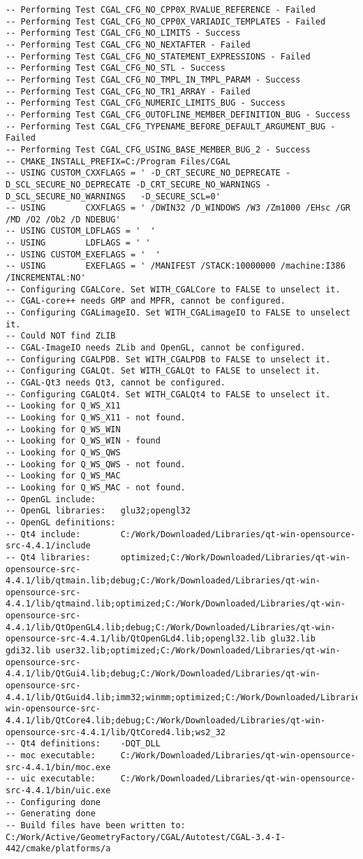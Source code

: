 {\begin{verbatim}
-- Performing Test CGAL_CFG_NO_CPP0X_RVALUE_REFERENCE - Failed
-- Performing Test CGAL_CFG_NO_CPP0X_VARIADIC_TEMPLATES - Failed
-- Performing Test CGAL_CFG_NO_LIMITS - Success
-- Performing Test CGAL_CFG_NO_NEXTAFTER - Failed
-- Performing Test CGAL_CFG_NO_STATEMENT_EXPRESSIONS - Failed
-- Performing Test CGAL_CFG_NO_STL - Success
-- Performing Test CGAL_CFG_NO_TMPL_IN_TMPL_PARAM - Success
-- Performing Test CGAL_CFG_NO_TR1_ARRAY - Failed
-- Performing Test CGAL_CFG_NUMERIC_LIMITS_BUG - Success
-- Performing Test CGAL_CFG_OUTOFLINE_MEMBER_DEFINITION_BUG - Success
-- Performing Test CGAL_CFG_TYPENAME_BEFORE_DEFAULT_ARGUMENT_BUG - Failed
-- Performing Test CGAL_CFG_USING_BASE_MEMBER_BUG_2 - Success
-- CMAKE_INSTALL_PREFIX=C:/Program Files/CGAL
-- USING CUSTOM_CXXFLAGS = ' -D_CRT_SECURE_NO_DEPRECATE -D_SCL_SECURE_NO_DEPRECATE -D_CRT_SECURE_NO_WARNINGS -D_SCL_SECURE_NO_WARNINGS   -D_SECURE_SCL=0'
-- USING        CXXFLAGS = ' /DWIN32 /D_WINDOWS /W3 /Zm1000 /EHsc /GR /MD /O2 /Ob2 /D NDEBUG'
-- USING CUSTOM_LDFLAGS = '  '
-- USING        LDFLAGS = ' '
-- USING CUSTOM_EXEFLAGS = '  '
-- USING        EXEFLAGS = ' /MANIFEST /STACK:10000000 /machine:I386 /INCREMENTAL:NO'
-- Configuring CGALCore. Set WITH_CGALCore to FALSE to unselect it.
-- CGAL-core++ needs GMP and MPFR, cannot be configured.
-- Configuring CGALimageIO. Set WITH_CGALimageIO to FALSE to unselect it.
-- Could NOT find ZLIB
-- CGAL-ImageIO needs ZLib and OpenGL, cannot be configured.
-- Configuring CGALPDB. Set WITH_CGALPDB to FALSE to unselect it.
-- Configuring CGALQt. Set WITH_CGALQt to FALSE to unselect it.
-- CGAL-Qt3 needs Qt3, cannot be configured.
-- Configuring CGALQt4. Set WITH_CGALQt4 to FALSE to unselect it.
-- Looking for Q_WS_X11
-- Looking for Q_WS_X11 - not found.
-- Looking for Q_WS_WIN
-- Looking for Q_WS_WIN - found
-- Looking for Q_WS_QWS
-- Looking for Q_WS_QWS - not found.
-- Looking for Q_WS_MAC
-- Looking for Q_WS_MAC - not found.
-- OpenGL include:     
-- OpenGL libraries:   glu32;opengl32
-- OpenGL definitions: 
-- Qt4 include:        C:/Work/Downloaded/Libraries/qt-win-opensource-src-4.4.1/include
-- Qt4 libraries:      optimized;C:/Work/Downloaded/Libraries/qt-win-opensource-src-4.4.1/lib/qtmain.lib;debug;C:/Work/Downloaded/Libraries/qt-win-opensource-src-4.4.1/lib/qtmaind.lib;optimized;C:/Work/Downloaded/Libraries/qt-win-opensource-src-4.4.1/lib/QtOpenGL4.lib;debug;C:/Work/Downloaded/Libraries/qt-win-opensource-src-4.4.1/lib/QtOpenGLd4.lib;opengl32.lib glu32.lib gdi32.lib user32.lib;optimized;C:/Work/Downloaded/Libraries/qt-win-opensource-src-4.4.1/lib/QtGui4.lib;debug;C:/Work/Downloaded/Libraries/qt-win-opensource-src-4.4.1/lib/QtGuid4.lib;imm32;winmm;optimized;C:/Work/Downloaded/Libraries/qt-win-opensource-src-4.4.1/lib/QtCore4.lib;debug;C:/Work/Downloaded/Libraries/qt-win-opensource-src-4.4.1/lib/QtCored4.lib;ws2_32
-- Qt4 definitions:    -DQT_DLL
-- moc executable:     C:/Work/Downloaded/Libraries/qt-win-opensource-src-4.4.1/bin/moc.exe
-- uic executable:     C:/Work/Downloaded/Libraries/qt-win-opensource-src-4.4.1/bin/uic.exe
-- Configuring done
-- Generating done
-- Build files have been written to: C:/Work/Active/GeometryFactory/CGAL/Autotest/CGAL-3.4-I-442/cmake/platforms/a
\end{verbatim}
}




